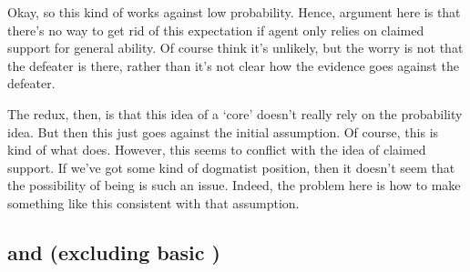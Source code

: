 \begin{note}
  Okay, so this kind of works against low probability.
  Hence, argument here is that there's no way to get rid of this expectation if agent only relies on claimed support for general ability.
  Of course think it's unlikely, but the worry is not that the defeater is there, rather than it's not clear how the evidence goes against the defeater.

  The redux, then, is that this idea of a `core' doesn't really rely on the probability idea.
  But then this just goes against the initial assumption.
  Of course, this is kind of what \citeauthor{Pryor:2000tl} does.
  However, this seems to conflict with the idea of claimed support.
  If we've got some kind of dogmatist position, then it doesn't seem that the possibility of being \mom{} is such an issue.
  Indeed, the problem here is how to make something like this consistent with that assumption.
\end{note}

\subsection{\nI{} and \adB{} (excluding basic \AR{})}
\label{sec:ni-ability:adB}

